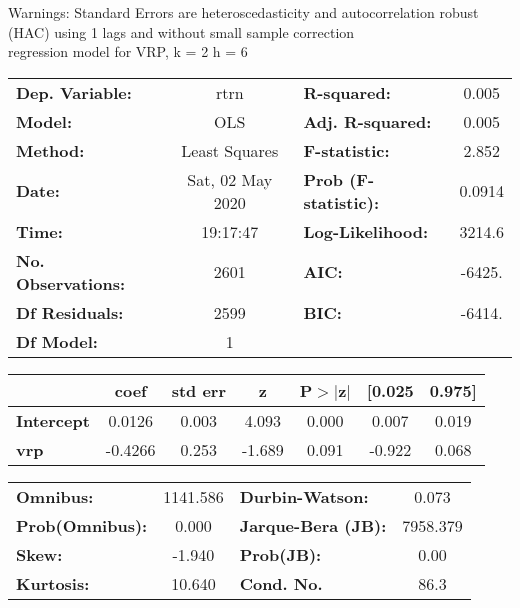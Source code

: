 Warnings: \newline
 [1] Standard Errors are heteroscedasticity and autocorrelation robust (HAC) using 1 lags and without small sample correction\\ 

regression model for VRP, k = 2 h = 6\begin{center}
\begin{tabular}{lclc}
\toprule
\textbf{Dep. Variable:}    &       rtrn       & \textbf{  R-squared:         } &     0.005   \\
\textbf{Model:}            &       OLS        & \textbf{  Adj. R-squared:    } &     0.005   \\
\textbf{Method:}           &  Least Squares   & \textbf{  F-statistic:       } &     2.852   \\
\textbf{Date:}             & Sat, 02 May 2020 & \textbf{  Prob (F-statistic):} &   0.0914    \\
\textbf{Time:}             &     19:17:47     & \textbf{  Log-Likelihood:    } &    3214.6   \\
\textbf{No. Observations:} &        2601      & \textbf{  AIC:               } &    -6425.   \\
\textbf{Df Residuals:}     &        2599      & \textbf{  BIC:               } &    -6414.   \\
\textbf{Df Model:}         &           1      & \textbf{                     } &             \\
\bottomrule
\end{tabular}
\begin{tabular}{lcccccc}
                   & \textbf{coef} & \textbf{std err} & \textbf{z} & \textbf{P$> |$z$|$} & \textbf{[0.025} & \textbf{0.975]}  \\
\midrule
\textbf{Intercept} &       0.0126  &        0.003     &     4.093  &         0.000        &        0.007    &        0.019     \\
\textbf{vrp}       &      -0.4266  &        0.253     &    -1.689  &         0.091        &       -0.922    &        0.068     \\
\bottomrule
\end{tabular}
\begin{tabular}{lclc}
\textbf{Omnibus:}       & 1141.586 & \textbf{  Durbin-Watson:     } &    0.073  \\
\textbf{Prob(Omnibus):} &   0.000  & \textbf{  Jarque-Bera (JB):  } & 7958.379  \\
\textbf{Skew:}          &  -1.940  & \textbf{  Prob(JB):          } &     0.00  \\
\textbf{Kurtosis:}      &  10.640  & \textbf{  Cond. No.          } &     86.3  \\
\bottomrule
\end{tabular}
\end{center}

